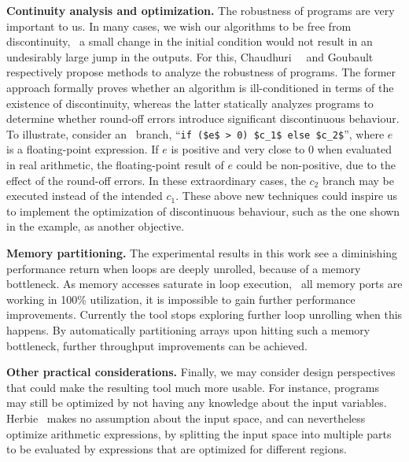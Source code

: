 \textbf{Continuity analysis and optimization.} The robustness of programs
are very important to us.  In many cases, we wish our algorithms to be
free from discontinuity, \ie~a small change in the initial condition
would not result in an undesirably large jump in the outputs.  For this,
Chaudhuri~\etal~\cite{chaudhuri11} and Goubault~\etal~\cite{goubault13}
respectively propose methods to analyze the robustness of programs.  The
former approach formally proves whether an algorithm is ill-conditioned
in terms of the existence of discontinuity, whereas the latter statically
analyzes programs to determine whether round-off errors introduce significant
discontinuous behaviour.  To illustrate, consider an \iflit~branch,
``\lstinline[basicstyle=\tt]{if ($e$ > 0) $c_1$ else $c_2$}'', where $e$
is a floating-point expression.  If $e$ is positive and very close to
$0$ when evaluated in real arithmetic, the floating-point result of $e$
could be non-positive, due to the effect of the round-off errors.  In
these extraordinary cases, the $c_2$ branch may be executed instead of the
intended $c_1$.  These above new techniques could inspire us to implement the
optimization of discontinuous behaviour, such as the one shown in the example,
as another objective.

\textbf{Memory partitioning.} The experimental results in this work see a
diminishing performance return when loops are deeply unrolled, because of a
memory bottleneck.  As memory accesses saturate in loop execution, \ie~all
memory ports are working in 100\% utilization, it is impossible to gain further
performance improvements.  Currently the tool stops exploring further loop
unrolling when this happens.  By automatically partitioning arrays upon hitting
such a memory bottleneck, further throughput improvements can be achieved.

\textbf{Other practical considerations.}  Finally, we may consider design
perspectives that could make the resulting tool much more usable.  For
instance, programs may still be optimized by not having any knowledge about
the input variables.  Herbie~\cite{panchekha15} makes no assumption about the
input space, and can nevertheless optimize arithmetic expressions, by splitting
the input space into multiple parts to be evaluated by expressions that are
optimized for different regions.



